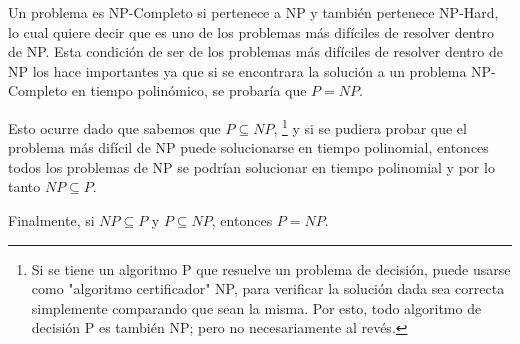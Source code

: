 \documentclass[../tp3_grupo404.tex]{subfiles}
\begin{document}
Un problema es NP-Completo si pertenece a NP y también pertenece NP-Hard,
lo cual quiere decir que es uno de los problemas más difíciles de resolver dentro de NP.
Esta condición de ser de los problemas más difíciles de resolver dentro de NP
los hace importantes ya que si se encontrara la solución a un problema NP-Completo
en tiempo polinómico, se probaría que $P = NP$.

Esto ocurre dado que sabemos que $P \subseteq NP$,
\footnote{ Si se tiene un algoritmo P que resuelve un problema de decisión,
puede usarse como "algoritmo certificador" NP, para verificar la solución dada sea correcta
simplemente comparando que sean la misma. Por esto, todo algoritmo de decisión P es también NP;
pero no necesariamente al revés.}
y si se pudiera probar que el problema más difícil de NP puede solucionarse en tiempo polinomial,
entonces todos los problemas de NP se podrían solucionar en tiempo polinomial
y por lo tanto $NP \subseteq  P$.

Finalmente, si $NP \subseteq P$ y $P \subseteq NP$, entonces $P = NP$.

\end{document}
